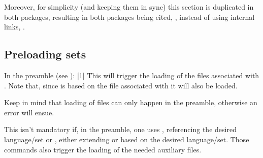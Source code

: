 
Moreover, for simplicity (and keeping them in sync) this section is duplicated in both packages, resulting in both packages being cited, \tsobj{\cite{}}, instead of using internal links, \tsobj{\ref{}}.

\subsection{Preloading sets}
 In the preamble (see ):
[1]
This will trigger the loading of the files associated with . Note that, since  is based on  the file associated with it will also be loaded.
\begin{tsremark}
  Keep in mind that loading of files can only happen in the preamble, otherwise an error will ensue.
\end{tsremark}
\begin{tsremark}
  This isn't mandatory if, in the preamble, one uses \tsobj{\hlSettings}, referencing the desired language/set or \tsobj[code,sep=/]{\hlLangDef,\hlKeysetDef}, either extending or based on the desired language/set. Those commands also trigger the loading of the needed auxiliary files.
\end{tsremark}

